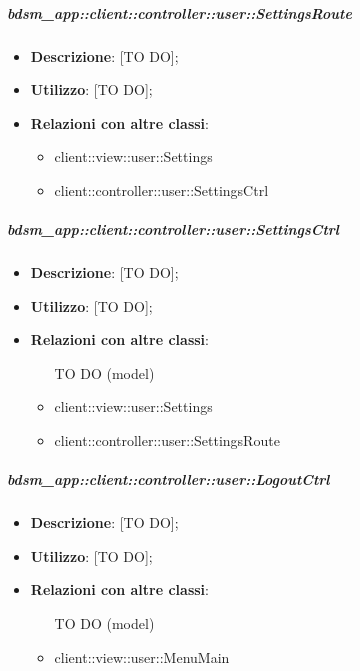 		\subparagraph{bdsm\_app::client::controller::user::SettingsRoute} %
		\label{subp:bdsm_app_client_controller_user_settingsroute}
			\begin{itemize}
				\item \textbf{Descrizione}: [TO DO];
				\item \textbf{Utilizzo}: [TO DO];
				\item \textbf{Relazioni con altre classi}:
					\begin{itemize}
						\item client::view::user::Settings
						\item client::controller::user::SettingsCtrl
					\end{itemize}
			\end{itemize}

		\subparagraph{bdsm\_app::client::controller::user::SettingsCtrl} %
		\label{subp:client_controller_user_settingsctrl}
			\begin{itemize}
				\item \textbf{Descrizione}: [TO DO];
				\item \textbf{Utilizzo}: [TO DO];
				\item \textbf{Relazioni con altre classi}:
					\begin{itemize}
						\item [TO DO] (model)
						\item client::view::user::Settings
						\item client::controller::user::SettingsRoute
					\end{itemize}
			\end{itemize}

		\subparagraph{bdsm\_app::client::controller::user::LogoutCtrl} %
		\label{subp:bdsm_app_client_controller_user_logoutctrl}
			\begin{itemize}
				\item \textbf{Descrizione}: [TO DO];
				\item \textbf{Utilizzo}: [TO DO];
				\item \textbf{Relazioni con altre classi}:
					\begin{itemize}
						\item [TO DO] (model)
						\item client::view::user::MenuMain
					\end{itemize}
			\end{itemize}

